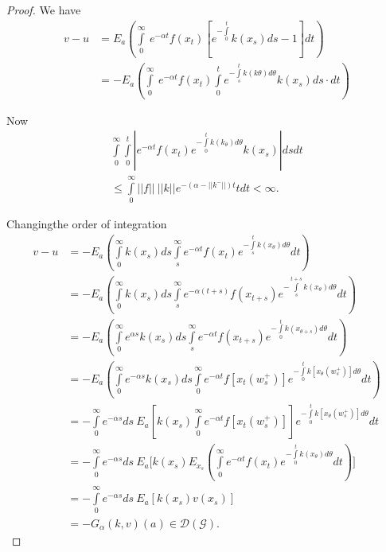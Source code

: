 \begin{proof}
  We have 
  \begin{align*}
    v - u & = E_a \left(\int\limits^\infty _0\ e^{ - \alpha t} f (x_t)
[e^{- \int\limits^t _0} k (x_s) ds -1]dt\right)\\ 
    & = - E_a \left(\int\limits^\infty _0\ e^{ - \alpha t} f(x_t)
    \int\limits^t_0 e^{-\int\limits^t _s k (k \theta)d \theta}
    k (x_s) ds\cdot dt \right) 
  \end{align*}

  Now 
  \begin{gather*}
    \int\limits^\infty _0 \int\limits^t _0\left| e^{- \alpha t} f
    (x_t) e^{ - \int\limits^t _0 k (k_\theta)d \theta}  k (x_s)
    \right| ds dt\\ 
    \leq \int\limits^\infty_0 || f ||\ || k || e ^{ - (\alpha - || k^-
      || )t } tdt < \infty .  
  \end{gather*} 

Changing\pageoriginale the order of integration 
\begin{align*}
v - u & = -  E_a \left(\int \limits^ \infty _ 0 k(x_s) ds \int\limits ^
\infty _s e^{ - \alpha t } f (x_t) e^{- \int \limits^ t _s  k
(x_\theta) d \theta }  dt\right) \\ 
& = -  E_a \left(\int \limits^ \infty _ 0 k(x_s) ds \int\limits ^
\infty _s e^{ - \alpha (t + s)} f (x_{t+s}) e^{- \int
\limits^{t+s}_s  
k (x_\theta) d \theta}  dt\right)\\ 
& = -  E_a \left(\int \limits^ \infty _ 0  e^ { \alpha s }k(x_s) ds
\int\limits ^ \infty _s e^{ - \alpha t } f (x_{t + s }) e ^{- \int
\limits^ {t} _0  k (x_{\theta +s} ) d \theta }  dt\right)\\ 
& =- E_a \left( \int \limits^ \infty _0  e^ {-\alpha s } k (x_s) ds
\int\limits^{\infty}_{0} e^{- \alpha t} f [x_t (w^+_s)]e^{-
\int\limits^t_0 k[x_\theta (w^+_s)]d \theta} dt \right)\\ 
& = - \int\limits^ \infty _ 0 e^{ - \alpha s } ds\ E_a \left[
k(x_{s})\int\limits^{\infty}_{0}e^{-\alpha
  t}f[x_{t}(w^{+}_{s})]\right]e^{-\int\limits^{t}_{0}k[x_{\theta}(w^{+}_{s})]d\theta}dt\\  
    & = - \int\limits^\infty_0 e^{-\alpha s} ds\ E_a \Bigg[ k
      (x_s) E_{x_s}\left(\int\limits^\infty_0 e^{-\alpha t}
      f(x_t)e^{-\int\limits_0^t k(x_\theta) d \theta} dt\right)\Bigg]\\ 
      & = - \int\limits^\infty_0 e^{-\alpha s} ds\ E_a \left[ k (x_s)
        v (x_s) \right]\\ 
      & = - G_\alpha (k, v )(a) \in \mathscr{D}(\mathscr{G}).
  \end{align*}


\end{proof}
